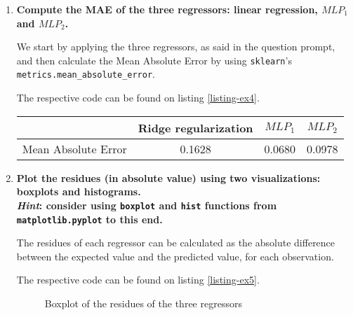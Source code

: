 \documentclass[12pt]{article}
\begin{document}
\begin{enumerate}[leftmargin=\labelsep,resume]
    \item {\color{questioncolor}\bfseries
          Compute the MAE of the three regressors: linear regression, $MLP_1$ and $MLP_2$.
          }\\
          \vspace{0.5em}

          We start by applying the three regressors, as said in the question prompt,
          and then calculate the Mean Absolute Error by using \texttt{sklearn}'s
          \texttt{metrics.mean\_absolute\_error}.

          The respective code can be found on listing \ref{listing-ex4}.

          \begin{center}
              \captionsetup{type=table}
              \begin{tabular}{c|c|c|c}
                                      & Ridge regularization & $MLP_1$ & $MLP_2$ \\
                  \hline
                  Mean Absolute Error & 0.1628               & 0.0680  & 0.0978
              \end{tabular}
          \end{center}


    \item {\color{questioncolor}\bfseries
          Plot the residues (in absolute value) using two visualizations: boxplots
          and histograms.\\
          \textit{Hint}: consider using \texttt{boxplot} and \texttt{hist} functions
          from \texttt{matplotlib.pyplot} to this end.
          }\\
          \vspace{0.5em}

          The residues of each regressor can be calculated as
          the absolute difference between the expected value and the
          predicted value, for each observation.

          The respective code can be found on listing \ref{listing-ex5}.

          \begin{figure}[H]
              \centering
              
              \caption{Boxplot of the residues of the three regressors}
              \label{fig:bloxplot}
          \end{figure}


\end{enumerate}
\end{document}
